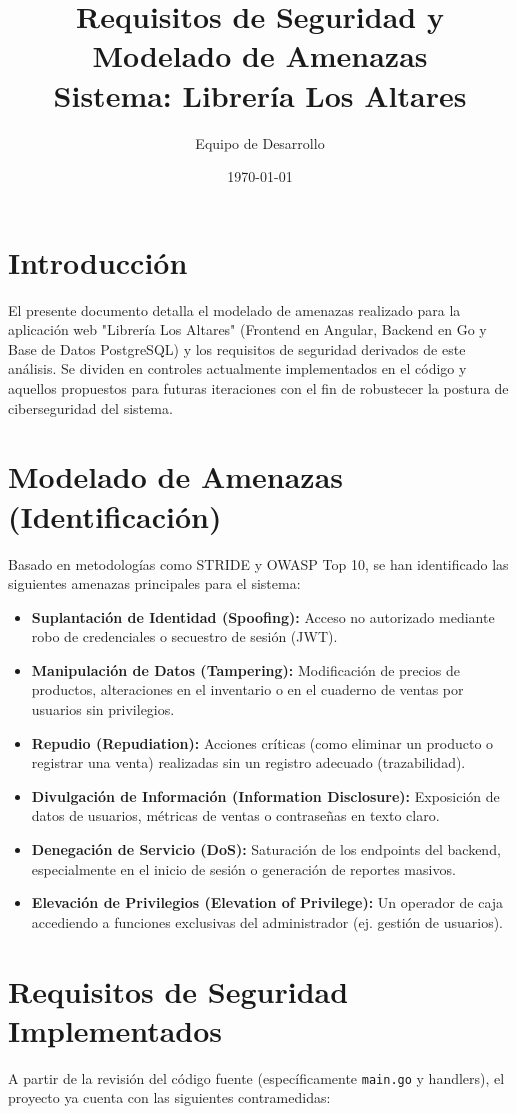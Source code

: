 \documentclass[12pt,a4paper]{article}
\title{\textbf{Requisitos de Seguridad y Modelado de Amenazas} \\ \Large{Sistema: Librería Los Altares}}
\author{Equipo de Desarrollo}
\date{\today}
\begin{document}
\maketitle

\section{Introducción}
El presente documento detalla el modelado de amenazas realizado para la aplicación web "Librería Los Altares" (Frontend en Angular, Backend en Go y Base de Datos PostgreSQL) y los requisitos de seguridad derivados de este análisis. Se dividen en controles actualmente implementados en el código y aquellos propuestos para futuras iteraciones con el fin de robustecer la postura de ciberseguridad del sistema.

\section{Modelado de Amenazas (Identificación)}
Basado en metodologías como STRIDE y OWASP Top 10, se han identificado las siguientes amenazas principales para el sistema:

\begin{itemize}
    \item \textbf{Suplantación de Identidad (Spoofing):} Acceso no autorizado mediante robo de credenciales o secuestro de sesión (JWT).
    \item \textbf{Manipulación de Datos (Tampering):} Modificación de precios de productos, alteraciones en el inventario o en el cuaderno de ventas por usuarios sin privilegios.
    \item \textbf{Repudio (Repudiation):} Acciones críticas (como eliminar un producto o registrar una venta) realizadas sin un registro adecuado (trazabilidad).
    \item \textbf{Divulgación de Información (Information Disclosure):} Exposición de datos de usuarios, métricas de ventas o contraseñas en texto claro.
    \item \textbf{Denegación de Servicio (DoS):} Saturación de los endpoints del backend, especialmente en el inicio de sesión o generación de reportes masivos.
    \item \textbf{Elevación de Privilegios (Elevation of Privilege):} Un operador de caja accediendo a funciones exclusivas del administrador (ej. gestión de usuarios).
\end{itemize}

\section{Requisitos de Seguridad Implementados}
A partir de la revisión del código fuente (específicamente \texttt{main.go} y handlers), el proyecto ya cuenta con las siguientes contramedidas:
\end{document}
